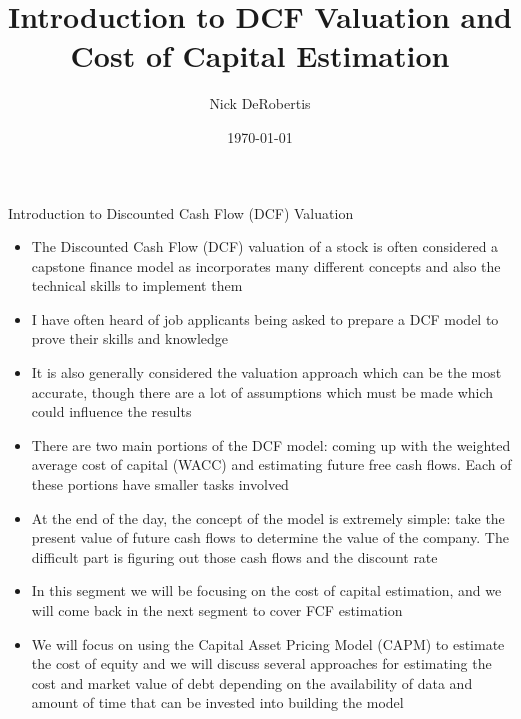 \documentclass[]{article}
\begin{document}
\title{Introduction to DCF Valuation and Cost of Capital Estimation}
\author{Nick DeRobertis}
\date{\today}
\maketitle
\begin{section}{Introduction to Discounted Cash Flow (DCF) Valuation}
\begin{itemize}
\item The Discounted Cash Flow (DCF) valuation of a stock is often considered a capstone finance model as incorporates many different concepts and also the technical skills to implement them
\item I have often heard of job applicants being asked to prepare a DCF model to prove their skills and knowledge
\item It is also generally considered the valuation approach which can be the most accurate, though there are a lot of assumptions which must be made which could influence the results
\item There are two main portions of the DCF model: coming up with the weighted average cost of capital (WACC) and estimating future free cash flows. Each of these portions have smaller tasks involved
\item At the end of the day, the concept of the model is extremely simple: take the present value of future cash flows to determine the value of the company. The difficult part is figuring out those cash flows and the discount rate
\item In this segment we will be focusing on the cost of capital estimation, and we will come back in the next segment to cover FCF estimation
\item We will focus on using the Capital Asset Pricing Model (CAPM) to estimate the cost of equity and we will discuss several approaches for estimating the cost and market value of debt depending on the availability of data and amount of time that can be invested into building the model
\end{itemize}
\end{section}
\end{document}
